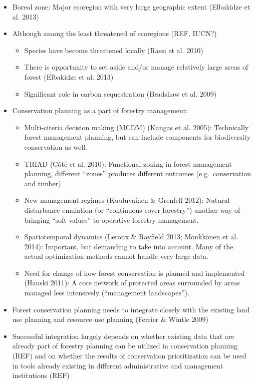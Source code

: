 \documentclass[]{article}
\begin{document}
\begin{itemize}
\item
  Boreal zone: Major ecoregion with very large geographic extent
  (Elbakidze et al. 2013)
\item
  Although among the least threatened of ecoregions (REF, IUCN?)

  \begin{itemize}
  \itemsep1pt\parskip0pt
  \item
    Species have become threatened locally (Rassi et al. 2010)
  \item
    There is opportunity to set aside and/or manage relatively large
    areas of forest (Elbakidze et al. 2013)
  \item
    Significant role in carbon sequestration (Bradshaw et al. 2009)
  \end{itemize}
\item
  Conservation planning as a part of forestry management:

  \begin{itemize}
  \itemsep1pt\parskip0pt
  \item
    Multi-citeria decision making (MCDM) (Kangas et al. 2005):
    Technically forest management planning, but can include components
    for biodiversity conservation as well.
  \item
    TRIAD (Côté et al. 2010): Functional zoning in forest management
    planning, different ``zones'' produces different outcomes
    (e.g.~conservation and timber)
  \item
    New management regimes (Kuuluvainen \& Grenfell 2012): Natural
    disturbance emulation (or ``continuous-cover forestry'') another way
    of bringing ``soft values'' to operative forestry management.
  \item
    Spatiotemporal dynamics (Leroux \& Rayfield 2013; Mönkkönen et al.
    2014): Important, but demanding to take into account. Many of the
    actual optimization methods cannot handle very large data.
  \item
    Need for change of how forest conservation is planned and
    implemented (Hanski 2011): A core network of protected areas
    surrounded by areas managed less intensively (``management
    landscapes'').
  \end{itemize}
\item
  Forest conservation planning needs to integrate closely with the
  existing land use planning and resource use planning (Ferrier \&
  Wintle 2009)
\item
  Successful integration largely depends on whether existing data that
  are already part of forestry planning can be utilized in conservation
  planning (REF) and on whether the results of conservation
  prioritization can be used in tools already existing in different
  administrative and management institutions (REF)


\end{itemize}
\end{document}
